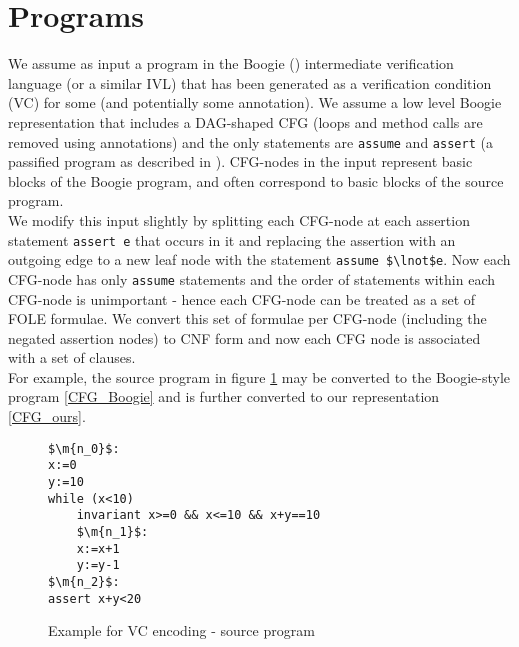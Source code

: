\bigskip

\section*{Programs}\label{section:preliminaries_programs}
We assume as input a program in the Boogie (\cite{BarnettCDJL05}) intermediate verification language (or a similar IVL) that has been generated as a verification condition (VC) for some  (and potentially some annotation).
We assume a low level Boogie representation that includes a DAG-shaped CFG (loops and method calls are removed using annotations) and the only statements are \lstinline|assume| and \lstinline|assert| (a passified program as described in \cite{Leino:2005:EWP:1066417.1710882}). CFG-nodes in the input represent basic blocks of the Boogie program, and often correspond to basic blocks of the source program.\\
We modify this input slightly by splitting each CFG-node at each assertion statement \lstinline|assert e| that occurs in it and replacing the assertion with an outgoing edge to a new leaf node with the statement \lstinline|assume $\lnot$e|. 
Now each CFG-node has only \lstinline|assume| statements and the order of statements within each CFG-node is unimportant - hence each CFG-node can be treated as a set of FOLE formulae. 
We convert this set of formulae per CFG-node (including the negated assertion nodes) to CNF form and now each CFG node is associated with a set of clauses. \\
For example, the source program in figure \ref{CFG_source_program} may be converted to the Boogie-style program \ref{CFG_Boogie} and is further converted to our representation \ref{CFG_ours}.
\begin{figure}
\begin{lstlisting}
$\m{n_0}$:
x:=0
y:=10
while (x<10)
	invariant x>=0 && x<=10 && x+y==10
	$\m{n_1}$:
	x:=x+1
	y:=y-1
$\m{n_2}$:
assert x+y<20
\end{lstlisting}
\caption{Example for VC encoding - source program}
\label{CFG_source_program}
\end{figure}

